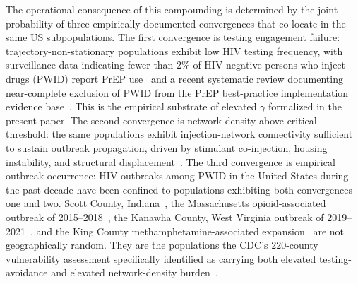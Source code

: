 \documentclass[11pt]{article}
\begin{document}
The operational consequence of this compounding is determined by the joint probability of three empirically-documented convergences that co-locate in the same US subpopulations. The first convergence is testing engagement failure: trajectory-non-stationary populations exhibit low HIV testing frequency, with surveillance data indicating fewer than 2\% of HIV-negative persons who inject drugs (PWID) report PrEP use~\cite{baugher2025nhbs} and a recent systematic review documenting near-complete exclusion of PWID from the PrEP best-practice implementation evidence base~\cite{kamitani2024systematic}. This is the empirical substrate of elevated $\gamma$ formalized in the present paper. The second convergence is network density above critical threshold: the same populations exhibit injection-network connectivity sufficient to sustain outbreak propagation, driven by stimulant co-injection, housing instability, and structural displacement~\cite{strathdee2020plus,desjarlais2022nyc}. The third convergence is empirical outbreak occurrence: HIV outbreaks among PWID in the United States during the past decade have been confined to populations exhibiting both convergences one and two. Scott County, Indiana~\cite{peters2016scott,gonsalves2018scott}, the Massachusetts opioid-associated outbreak of 2015--2018~\cite{alpren2020massachusetts}, the Kanawha County, West Virginia outbreak of 2019--2021~\cite{bonacci2023kanawha,nolen2022wv}, and the King County methamphetamine-associated expansion~\cite{glick2018king} are not geographically random. They are the populations the CDC's 220-county vulnerability assessment specifically identified as carrying both elevated testing-avoidance and elevated network-density burden~\cite{cdc220counties}.
\end{document}
